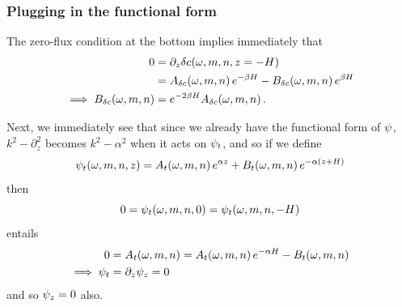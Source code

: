 \documentclass[reqno]{amsart}
\numberwithin{equation}{section}
\numberwithin{figure}{section}
\begin{document}
\subsubsection{Plugging in the functional form}

The zero-flux condition at the bottom implies immediately that
\begin{align*}
0 &= \partial_{z}\delta c\!\left(\omega,m,n,z=-H\right) \\
  &= A_{\delta c}\!\left(\omega,m,n\right)e^{-\beta H}-B_{\delta c}\!\left(\omega,m,n\right)e^{\beta H} \\
\implies B_{\delta c}\!\left(\omega,m,n\right)
  &= e^{-2\beta H}A_{\delta c}\!\left(\omega,m,n\right).
\end{align*}

Next, we immediately see that since we already have the functional form of $\psi$, $k^{2}-\partial_{z}^{2}$ becomes $k^{2}-\alpha^{2}$ when it acts on $\psi_{t}$, and so if we define
\begin{equation*}
\psi_{t}\!\left(\omega,m,n,z\right)=A_{t}\!\left(\omega,m,n\right)e^{\alpha z}+B_{t}\!\left(\omega,m,n\right)e^{-\alpha\left(z+H\right)}
\end{equation*}
then
\begin{equation*}
0=\psi_{t}\!\left(\omega,m,n,0\right)=\psi_{t}\!\left(\omega,m,n,-H\right)
\end{equation*}
entails
\begin{align*}
0 &= A_{t}\!\left(\omega,m,n\right) = A_{t}\!\left(\omega,m,n\right)e^{-\alpha H}-B_{t}\!\left(\omega,m,n\right) \\
\implies \psi_{t} &= \partial_{z}\psi_{z}=0
\end{align*}
and so $\psi_{z}=0$ also.
\end{document}
